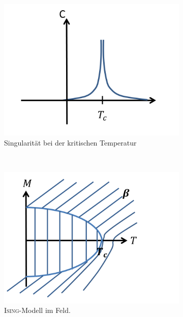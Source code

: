 \documentclass[12pt]{article}
\begin{document}
\begin{figure}[h] 
		\begin{subfigure}[h]{0.5 \textwidth}
		\centering
		\includegraphics[width=\textwidth]{Folie35.png}
		\caption{Singularität bei der kritischen Temperatur} 
		\label{fig:Singularity}
		\centering
	\end{subfigure}
	~
\begin{subfigure}[h]{0.5\textwidth}
		\centering
		\includegraphics[width=\textwidth]{Folie36.png}
		\caption{\textsc{Ising}-Modell im Feld.}
		\label{fig:IsingmodellimFeld}
		\centering
	\end{subfigure}
	\caption{ }
\end{figure}	
\end{document}
